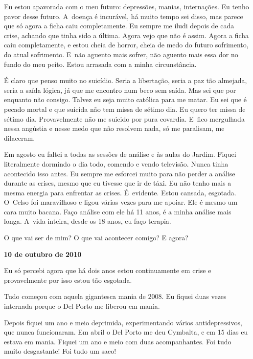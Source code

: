 Eu estou apavorada com o meu futuro: depressões, manias, internações. Eu
tenho pavor desse futuro. A~doença é incurável, há muito tempo sei
disso, mas parece que só agora a ficha caiu completamente. Eu sempre me
iludi depois de cada crise, achando que tinha sido a última. Agora vejo
que não é assim. Agora a ficha caiu completamente, e estou cheia de
horror, cheia de medo do futuro sofrimento, do atual sofrimento. E~não
aguento mais sofrer, não aguento mais essa dor no fundo do meu peito.
Estou arrasada com a minha circunstância.

É claro que penso muito no suicídio. Seria a libertação, seria a paz tão
almejada, seria a saída lógica, já que me encontro num beco sem saída.
Mas sei que por enquanto não consigo. Talvez eu seja muito católica para
me matar. Eu sei que é pecado mortal e que suicida não tem missa de sétimo
dia. Eu quero ter missa de sétimo dia. Provavelmente não me suicido por
pura covardia. E~fico mergulhada nessa angústia e nesse medo que não
resolvem nada, só me paralisam, me dilaceram.

Em agosto eu faltei a todas as sessões de análise e às aulas do Jardim.
Fiquei literalmente dormindo o dia todo, comendo e vendo televisão. Nunca
tinha acontecido isso antes. Eu sempre me esforcei muito para não perder
a análise durante as crises, mesmo que eu tivesse que ir de táxi. Eu não
tenho mais a mesma energia para enfrentar as crises. É~evidente. Estou
cansada, esgotada. O~Celso foi maravilhoso e ligou várias vezes para me
apoiar. Ele é mesmo um cara muito bacana. Faço análise com ele há 11
anos, é a minha análise mais longa. A~vida inteira, desde os 18 anos, eu
faço terapia.

O que vai ser de mim? O que vai acontecer comigo? E agora?

\begin{flushright}\textbf{10 de outubro de 2010}\end{flushright}


Eu só percebi agora que há dois anos estou continuamente em crise e
provavelmente por isso estou tão esgotada.

Tudo começou com aquela gigantesca mania de 2008. Eu fiquei duas vezes
internada porque o Del Porto me liberou em mania.

Depois fiquei um ano e meio deprimida, experimentando vários
antidepressivos, que nunca funcionaram. Em abril o Del Porto me deu
Cymbalta, e em 15 dias eu estava em mania. Fiquei um ano e meio com duas
acompanhantes. Foi tudo muito desgastante! Foi tudo um saco!

